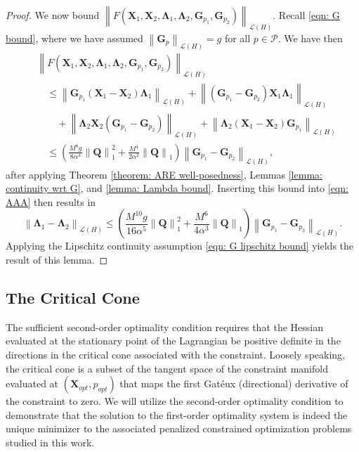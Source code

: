 \documentclass{amsart}
\newcommand{\sL}{\mathscr L}
\newcommand{\p}[1]{\left( {#1} \right)}
\newcommand{\norm}[1]{\left\| #1 \right\|}
\newcommand{\sP}{\mathcal{P}}
\newcommand{\bX}{\mathbf X}
\newcommand{\bQ}{\mathbf Q}
\newcommand{\bG}{\mathbf G}
\newcommand{\bLambda}{\boldsymbol{\Lambda}}
\begin{document}
\begin{proof}
    We now bound $\norm{F\p{\bX_1,\bX_2,\bLambda_1, \bLambda_2, \bG_{p_1}, \bG_{p_2}}}_{\sL\p{H}}$. Recall \eqref{eqn: G bound}, where we have assumed $\norm{\bG_{p}}_{\sL(H)} = g$ for all $p \in \sP$. We have then
    $$
    \begin{aligned}
        &\norm{F(\bX_1, \bX_2, \bLambda_1, \bLambda_2, \bG_{p_1}, \bG_{p_2})}_{\sL\p{H}} \\
        & \quad \leq \norm{\bG_{p_1}(\bX_1-\bX_2)\bLambda_1}_{\sL\p{H}}
        + \norm{(\bG_{p_1} - \bG_{p_2})\bX_1\bLambda_1 }_{\sL\p{H}} 
        \\&\qquad
        + \norm{\bLambda_2 \bX_2(\bG_{p_1}-\bG_{p_2})}_{\sL\p{H}} 
        + \norm{\bLambda_2(\bX_1 - \bX_2)\bG_{p_1}}_{\sL\p{H}} \\ 
        &\quad \leq \p{\frac{M^8g}{8\alpha^4} \norm{\bQ}^2_1 + \frac{M^4}{2\alpha^2}\norm{\bQ}_1} \norm{\bG_{p_1} - \bG_{p_2}}_{\sL(H)},
    \end{aligned}
    $$
    after applying Theorem \ref{theorem: ARE well-posedness}, Lemmas \ref{lemma: continuity wrt G}, and \ref{lemma: Lambda bound}. Inserting this bound into \eqref{eqn: AAA} then results in 
    $$
        \norm{\bLambda_1 - \bLambda_2}_{\sL\p{H}} 
        \leq \p{\frac{M^{10}g}{16\alpha^5}\norm{\bQ}^2_1 
        + \frac{M^6}{4\alpha^3}\norm{\bQ}_1 } \norm{\bG_{p_1} - \bG_{p_2}}_{\sL(H)}.
    $$
    Applying the Lipschitz continuity assumption \eqref{eqn: G lipschitz bound} yields the result of this lemma. 
\end{proof}


\subsection{The Critical Cone}
The sufficient second-order optimality condition requires that the Hessian evaluated at the stationary point of the Lagrangian be positive definite in the directions in the critical cone associated with the constraint. Loosely speaking, the critical cone is a subset of the tangent space of the constraint manifold evaluated at $\p{\bX_{opt}, p_{opt}}$ that maps the first Gat\'eux (directional) derivative of the constraint to zero. We will utilize the second-order optimality condition to demonstrate that the solution to the first-order optimality system is indeed the unique minimizer to the associated penalized constrained optimization problems studied in this work. 
\end{document}
